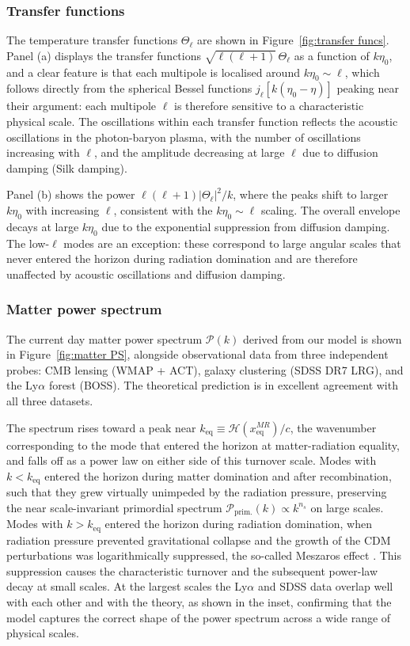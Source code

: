 \documentclass[twocolumn]{aa}
\begin{document}
\subsubsection{Transfer functions}
The temperature transfer functions $\Theta_\ell$ are shown in Figure~\ref{fig:transfer funcs}. Panel (a) displays the transfer functions $\sqrt{\ell(\ell+1)}\,\Theta_\ell$ as a function of $k\eta_0$, and a clear feature is that each multipole is localised around $k\eta_0 \sim \ell$, which follows directly from the spherical Bessel functions $j_\ell[k(\eta_0-\eta)]$ peaking near their argument: each multipole $\ell$ is therefore sensitive to a characteristic physical scale. The oscillations within each transfer function reflects the acoustic oscillations in the photon-baryon plasma, with the number of oscillations increasing with $\ell$, and the amplitude decreasing at large $\ell$ due to diffusion damping (Silk damping).

Panel (b) shows the power $\ell(\ell+1)|\Theta_\ell|^2/k$, where the peaks shift to larger $k\eta_0$ with increasing $\ell$, consistent with the $k\eta_0\sim\ell$ scaling. The overall envelope decays at large $k\eta_0$ due to the exponential suppression from diffusion damping. The low-$\ell$ modes are an exception: these correspond to large angular scales that never entered the horizon during radiation domination and are therefore unaffected by acoustic oscillations and diffusion damping. 


\subsubsection{Matter power spectrum}
The current day matter power spectrum $\mathcal{P}(k)$ derived from our model is shown in Figure~\ref{fig:matter PS}, alongside observational data from three independent probes: CMB lensing (WMAP + ACT), galaxy clustering (SDSS DR7 LRG), and the Ly$\alpha$ forest (BOSS). The theoretical prediction is in excellent agreement with all three datasets.

The spectrum rises toward a peak near $k_\text{eq}\equiv \mathcal{H}(x_\text{eq}^{MR})/c$, the wavenumber corresponding to the mode that entered the horizon at matter-radiation equality, and falls off as a power law on either side of this turnover scale. Modes with $k < k_\text{eq}$ entered the horizon during matter domination and after recombination, such that they grew virtually unimpeded by the radiation pressure, preserving the near scale-invariant primordial spectrum $\mathcal{P}_\text{prim.}(k) \propto k^{n_s}$ on large scales. Modes with $k > k_\text{eq}$ entered the horizon during radiation domination, when radiation pressure prevented gravitational collapse and the growth of the CDM perturbations was logarithmically suppressed, the so-called Meszaros effect \citep{Meszaros}. This suppression causes the characteristic turnover and the subsequent power-law decay at small scales. At the largest scales the Ly$\alpha$ and SDSS data overlap well with each other and with the theory, as shown in the inset, confirming that the model captures the correct shape of the power spectrum across a wide range of physical scales.
\end{document}
